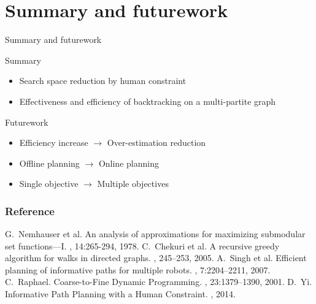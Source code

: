 \section{Summary and futurework}

\begin{frame}{Summary and futurework}

\begin{block}{Summary}
\begin{itemize}
\item Search space reduction by \alert{human constraint}
\item Effectiveness and efficiency of \alert{backtracking} on a multi-partite graph
\end{itemize}
\end{block}

\bigskip

\begin{block}{Futurework}
\begin{itemize}
\item Efficiency increase  $ \rightarrow $ Over-estimation reduction
\item Offline planning $ \rightarrow $ Online planning
\item Single objective $ \rightarrow $ Multiple objectives
\end{itemize}
\end{block}

\end{frame}

\begin{frame}[allowframebreaks]
  \frametitle<presentation>{Reference}    
  \begin{thebibliography}{10} 
	\beamertemplatearticlebibitems
	 G.~Nemhauser et al.
	 \newblock An analysis of approximations for maximizing submodular set functions—I.
	 ,  14:265-294, 1978.
	\beamertemplatearticlebibitems
	  C.~Chekuri et al.
	  \newblock A recursive greedy algorithm for walks in directed graphs.
	  , 245--253, 2005.   
	\beamertemplatearticlebibitems
	  A.~Singh et al.
	  \newblock Efficient planning of informative paths for multiple robots.
	  , 7:2204--2211, 2007.
	\beamertemplatearticlebibitems
	C.~Raphael.
	\newblock Coarse-to-Fine Dynamic Programming.
	, 23:1379--1390, 2001.
	\beamertemplatearticlebibitems
	D.~Yi.
	\newblock Informative Path Planning with a Human Constraint.
	, 2014.
  \end{thebibliography}
\end{frame}